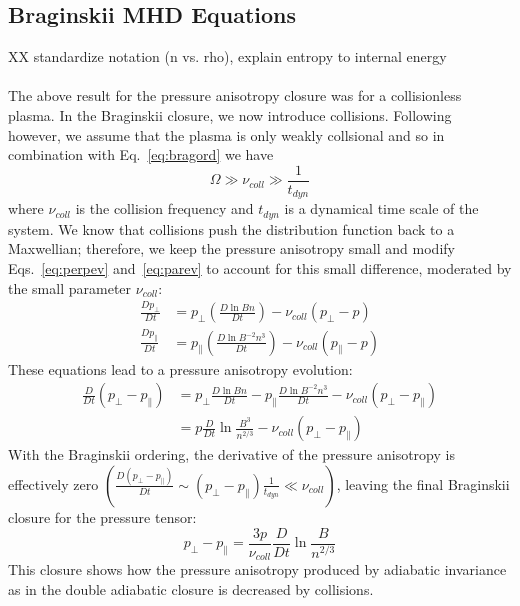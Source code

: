 \subsection{Braginskii MHD Equations} \label{ssec:bragclosure}
XX standardize notation (n vs. rho), explain entropy to internal energy\\
\\
The above result for the pressure anisotropy closure was for a collisionless plasma. In the Braginskii closure, we now introduce collisions. Following~\citet{KunzBraginskii} however, we assume that the plasma is only weakly collsional and so in combination with Eq.~\ref{eq:bragord} we have
\begin{equation*}
  \Omega\gg\nu_{coll}\gg \frac1{t_{dyn}}
\end{equation*}
where $\nu_{coll}$ is the collision frequency and $t_{dyn}$ is a dynamical time scale of the system. We know that collisions push the distribution function back to a Maxwellian; therefore, we keep the pressure anisotropy small and modify Eqs.~\ref{eq:perpev} and~\ref{eq:parev} to account for this small difference, moderated by the small parameter $\nu_{coll}$:
\begin{align*}
  \frac{Dp_\perp}{Dt}&=p_\perp\left(\frac{D\ln Bn}{Dt}\right)-\nu_{coll}(p_\perp-p)\\
  \frac{Dp_\parallel}{Dt}&=p_\parallel\left(\frac{D\ln B^{-2}n^3}{Dt}\right)-\nu_{coll}(p_\parallel-p)
\end{align*}
These equations lead to a pressure anisotropy evolution:
\begin{align*}
  \frac{D}{Dt}(p_\perp-p_\parallel)&=p_\perp\frac{D\ln Bn}{Dt}-p_\parallel\frac{D\ln B^{-2}n^3}{Dt}-\nu_{coll}(p_\perp-p_\parallel)\\
  &=p\frac{D}{Dt}\ln\frac{B^3}{n^{2/3}}-\nu_{coll}(p_\perp-p_\parallel)
\end{align*}
With the Braginskii ordering, the derivative of the pressure anisotropy is effectively zero $\left(\frac{D(p_\perp-p_\parallel)}{Dt}\sim (p_\perp-p_\parallel)\frac1{t_{dyn}}\ll\nu_{coll}\right)$, leaving the final Braginskii closure for the pressure tensor:
\begin{equation}
  p_\perp-p_\parallel=\frac{3p}{\nu_{coll}}\frac{D}{Dt}\ln\frac{B}{n^{2/3}} \label{eq:bragclosure}
\end{equation}
This closure shows how the pressure anisotropy produced by adiabatic invariance as in the double adiabatic closure is decreased by collisions. \\
